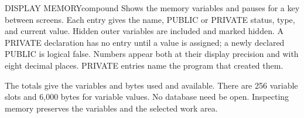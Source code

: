 \begin{XbaseEntry}{DISPLAY MEMORY}{compound}
Shows the memory variables and pauses for a key between screens.
\Syntax
{}
\Usage
Each entry gives the name, PUBLIC or PRIVATE status, type, and current value.
Hidden outer variables are included and marked hidden.  A PRIVATE declaration
has no entry until a value is assigned; a newly declared PUBLIC is logical
false.  Numbers appear both at their display precision and with eight decimal
places.  PRIVATE entries name the program that created them.

The totals give the variables and bytes used and available.  There are 256
variable slots and 6,000 bytes for variable values.  No database need be open.
Inspecting memory preserves the variables and the selected work area.
\end{XbaseEntry}

